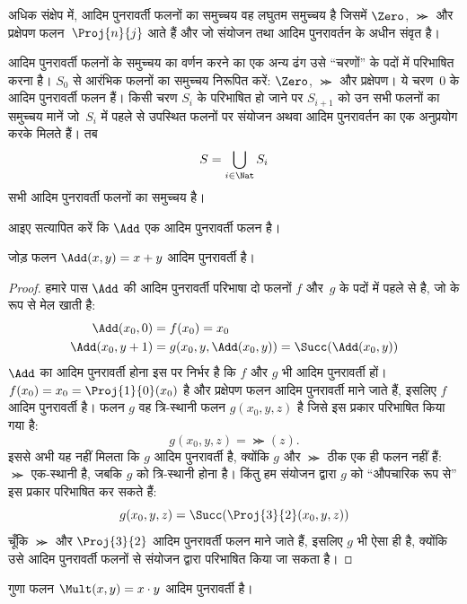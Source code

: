 \documentclass[../../../include/open-logic-section]{subfiles}
\begin{document}
\begin{explain}
अधिक संक्षेप में, आदिम पुनरावर्ती फलनों का समुच्चय वह लघुतम समुच्चय है
जिसमें $\Zero$, $\Succ$ और प्रक्षेपण फलन~$\Proj{n}{j}$ आते हैं और जो
संयोजन तथा आदिम पुनरावर्तन के अधीन संवृत है।

आदिम पुनरावर्ती फलनों के समुच्चय का वर्णन करने का एक अन्य ढंग उसे
``चरणों'' के पदों में परिभाषित करना है। $S_0$ से आरंभिक फलनों का समुच्चय
निरूपित करें: $\Zero$, $\Succ$ और प्रक्षेपण। ये चरण~$0$ के आदिम
पुनरावर्ती फलन हैं। किसी चरण $S_i$ के परिभाषित हो जाने पर $S_{i+1}$ को
उन सभी फलनों का समुच्चय मानें जो~$S_i$ में पहले से उपस्थित फलनों पर
संयोजन अथवा आदिम पुनरावर्तन का एक अनुप्रयोग करके मिलते हैं। तब
\[
S = \bigcup_{i \in \Nat} S_i
\]
सभी आदिम पुनरावर्ती फलनों का समुच्चय है।
\end{explain}

आइए सत्यापित करें कि $\Add$ एक आदिम पुनरावर्ती फलन है।

\begin{prop}
  जोड़ फलन $\Add(x,y) = x+y$ आदिम पुनरावर्ती है।
\end{prop}

\begin{proof}
हमारे पास $\Add$ की आदिम पुनरावर्ती परिभाषा दो फलनों $f$ और~$g$ के
पदों में पहले से है, जो  के रूप से मेल
खाती है:
\begin{align*}
  \Add(x_0, 0) & = f(x_0) = x_0\\
  \Add(x_0, y+1) & = g(x_0, y, \Add(x_0, y)) =
  \Succ(\Add(x_0, y))
\end{align*}
$\Add$ का आदिम पुनरावर्ती होना इस पर निर्भर है कि $f$ और $g$ भी आदिम
पुनरावर्ती हों। $f(x_0) = x_0 = \Proj{1}{0}(x_0)$ है और प्रक्षेपण फलन आदिम
पुनरावर्ती माने जाते हैं, इसलिए $f$ आदिम पुनरावर्ती है। फलन $g$ वह
त्रि-स्थानी फलन $g(x_0, y, z)$ है जिसे इस प्रकार परिभाषित किया गया है:
\[
g(x_0, y, z) = \Succ(z).
\]
इससे अभी यह नहीं मिलता कि $g$ आदिम पुनरावर्ती है, क्योंकि $g$ और
$\Succ$ ठीक एक ही फलन नहीं हैं: $\Succ$ एक-स्थानी है, जबकि $g$ को
त्रि-स्थानी होना है। किंतु हम संयोजन द्वारा $g$ को ``औपचारिक रूप से''
इस प्रकार परिभाषित कर सकते हैं:
\[
g(x_0, y, z) = \Succ(\Proj{3}{2}(x_0, y, z))
\]
चूँकि $\Succ$ और $\Proj{3}{2}$ आदिम पुनरावर्ती फलन माने जाते हैं, इसलिए
$g$ भी ऐसा ही है, क्योंकि उसे आदिम पुनरावर्ती फलनों से संयोजन द्वारा
परिभाषित किया जा सकता है।
\end{proof}

\begin{prop}
  गुणा फलन $\Mult(x,y) = x \cdot y$ आदिम पुनरावर्ती है।
\end{prop}
\end{document}
